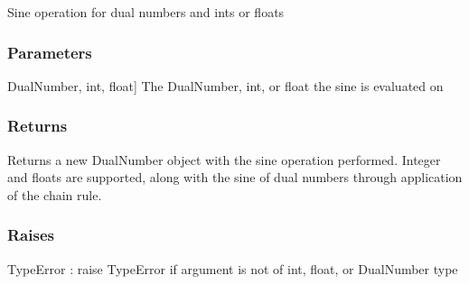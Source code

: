 \documentclass[letterpaper,10pt,english]{sphinxmanual}
\begin{document}
\begin{fulllineitems}
\label{\detokenize{autodiff:autodiff.sin}}
\pysigstartsignatures
{}
\pysigstopsignatures
\sphinxAtStartPar
Sine operation for dual numbers and ints or floats


\subsubsection{Parameters}
\label{\detokenize{autodiff:id60}}\begin{description}
\sphinxlineitem{x}{[}DualNumber, int, float{]}
\sphinxAtStartPar
The DualNumber, int, or float the sine is evaluated on

\end{description}


\subsubsection{Returns}
\label{\detokenize{autodiff:id61}}\begin{description}
\sphinxAtStartPar
Returns a new DualNumber object with the sine operation performed. Integer and
floats are supported, along with the sine of dual numbers through application 
of the chain rule.

\end{description}


\subsubsection{Raises}
\label{\detokenize{autodiff:id62}}
\sphinxAtStartPar
TypeError : raise TypeError if argument is not of int, float, or DualNumber type

\end{fulllineitems}

\end{document}

